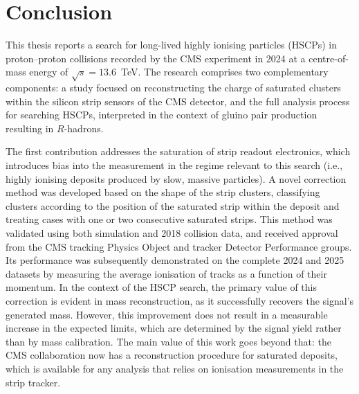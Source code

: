 \chapter*{Conclusion}
\label{ch:Conclusion}

\vspace{-0.5 cm}

This thesis reports a search for long-lived highly ionising particles (HSCPs) in proton--proton collisions recorded by the CMS experiment in 2024 at a centre-of-mass energy of $\sqrt{s} = 13.6$~TeV. The research comprises two complementary components: a study focused on reconstructing the charge of saturated \dedx{} clusters within the silicon strip sensors of the CMS detector, and the full analysis process for searching HSCPs, interpreted in the context of gluino pair production resulting in $R$-hadrons.
% 
\vspace{0.5 cm}

The first contribution addresses the saturation of strip readout electronics, which introduces bias into the \dedx{} measurement in the regime relevant to this search (i.e., highly ionising deposits produced by slow, massive particles). A novel correction method was developed based on the shape of the strip clusters, classifying clusters according to the position of the saturated strip within the deposit and treating cases with one or two consecutive saturated strips. This method was validated using both simulation and 2018 collision data, and received approval from the CMS tracking Physics Object and tracker Detector Performance groups. Its performance was subsequently demonstrated on the complete 2024 and 2025 datasets by measuring the average ionisation of tracks as a function of their momentum. In the context of the HSCP search, the primary value of this correction is evident in mass reconstruction, as it successfully recovers the signal's generated mass. However, this improvement does not result in a measurable increase in the expected limits, which are determined by the signal yield rather than by mass calibration. The main value of this work goes beyond that: the CMS collaboration now has a reconstruction procedure for saturated deposits, which is available for any analysis that relies on ionisation measurements in the strip tracker.

\vspace{0.5 cm}

